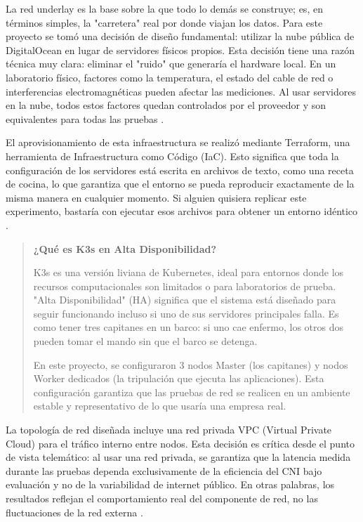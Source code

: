 \documentclass[journal]{IEEEtran}
\begin{document}
La red underlay es la base sobre la que todo lo demás se construye; es, en términos simples, la "carretera" real por donde viajan los datos. Para este proyecto se tomó una decisión de diseño fundamental: utilizar la nube pública de DigitalOcean en lugar de servidores físicos propios. Esta decisión tiene una razón técnica muy clara: eliminar el "ruido" que generaría el hardware local. En un laboratorio físico, factores como la temperatura, el estado del cable de red o interferencias electromagnéticas pueden afectar las mediciones. Al usar servidores en la nube, todos estos factores quedan controlados por el proveedor y son equivalentes para todas las pruebas \cite{ref2}.

El aprovisionamiento de esta infraestructura se realizó mediante Terraform, una herramienta de Infraestructura como Código (IaC). Esto significa que toda la configuración de los servidores está escrita en archivos de texto, como una receta de cocina, lo que garantiza que el entorno se pueda reproducir exactamente de la misma manera en cualquier momento. Si alguien quisiera replicar este experimento, bastaría con ejecutar esos archivos para obtener un entorno idéntico \cite{ref7}.

\begin{quote}
\textbf{¿Qué es K3s en Alta Disponibilidad?}

K3s es una versión liviana de Kubernetes, ideal para entornos donde los recursos computacionales son limitados o para laboratorios de prueba. "Alta Disponibilidad" (HA) significa que el sistema está diseñado para seguir funcionando incluso si uno de sus servidores principales falla. Es como tener tres capitanes en un barco: si uno cae enfermo, los otros dos pueden tomar el mando sin que el barco se detenga.

En este proyecto, se configuraron 3 nodos Master (los capitanes) y nodos Worker dedicados (la tripulación que ejecuta las aplicaciones). Esta configuración garantiza que las pruebas de red se realicen en un ambiente estable y representativo de lo que usaría una empresa real.
\end{quote}

La topología de red diseñada incluye una red privada VPC (Virtual Private Cloud) para el tráfico interno entre nodos. Esta decisión es crítica desde el punto de vista telemático: al usar una red privada, se garantiza que la latencia medida durante las pruebas dependa exclusivamente de la eficiencia del CNI bajo evaluación y no de la variabilidad de internet público. En otras palabras, los resultados reflejan el comportamiento real del componente de red, no las fluctuaciones de la red externa \cite{ref8}.
\end{document}
